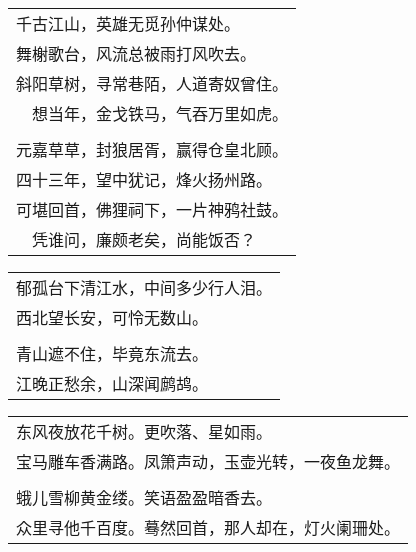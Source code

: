 \noindent\begin{minipage}{\linewidth}
  \vskip-3pt\begin{table}[H]
    \centering
    \begin{tabular}{@{}l@{}}
千古江山，英雄无觅孙仲谋处。\\
舞榭歌台，风流总被雨打风吹去。\\
斜阳草树，寻常巷陌，人道寄奴曾住。\\
　想当年，金戈铁马，气吞万里如虎。\\
\\
元嘉草草，封狼居胥，赢得仓皇北顾。\\
四十三年，望中犹记，烽火扬州路。\\
可堪回首，佛狸祠下，一片神鸦社鼓。\\
　凭谁问，廉颇老矣，尚能饭否？
    \end{tabular}
  \end{table}
\end{minipage}
\vspace{1cm}


\noindent\begin{minipage}{\linewidth}
  \vskip-3pt\begin{table}[H]
    \centering
    \begin{tabular}{@{}l@{}}
郁孤台下清江水，中间多少行人泪。\\
西北望长安，可怜无数山。\\
\\
青山遮不住，毕竟东流去。\\
江晚正愁余，山深闻鹧鸪。
    \end{tabular}
  \end{table}
\end{minipage}
\vspace{1cm}


\noindent\begin{minipage}{\linewidth}
  \vskip-3pt\begin{table}[H]
    \centering
    \begin{tabular}{@{}l@{}}
东风夜放花千树。更吹落、星如雨。\\
宝马雕车香满路。凤箫声动，玉壶光转，一夜鱼龙舞。\\
\\
蛾儿雪柳黄金缕。笑语盈盈暗香去。\\
众里寻他千百度。蓦然回首，那人却在，灯火阑珊处。
    \end{tabular}
  \end{table}
\end{minipage}
\vspace{1cm}



